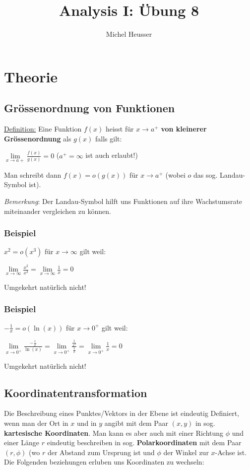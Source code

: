 \documentclass[11pt]{article} %
\title{Analysis I: Übung 8}
\author{Michel Heusser}
\begin{document}
\maketitle

\section{Theorie}

\subsection{Grössenordnung von Funktionen}
\underline{Definition:} Eine Funktion $f(x)$ heisst für $x \rightarrow a^+$ {\bf von kleinerer Grössenordnung} als $g(x)$ falls gilt:
\begin{center}
$\lim \limits_{x \rightarrow a+} \frac{f(x)}{g(x)} = 0$ ($a^+ = \infty$ ist auch erlaubt!)
\end{center}
Man schreibt dann $f(x) = o(g(x))$ für $x \rightarrow a^+$ (wobei $o$ das sog. Landau-Symbol ist). 

\emph{Bemerkung}: Der Landau-Symbol hilft uns Funktionen auf ihre Wachstumsrate miteinander vergleichen zu können. 

\subsubsection{Beispiel}

$x^2 = o(x^3)$ für $x \rightarrow \infty$ gilt weil:

$\lim \limits_{x \rightarrow \infty} \frac{x^2}{x^3} = \lim \limits_{x \rightarrow \infty} \frac{1}{x} =0$ 

Umgekehrt natürlich nicht!

\subsubsection{Beispiel}

$-\frac{1}{x} = o(\ln(x))$ für $x \rightarrow 0^+$ gilt weil: 

$\lim \limits_{x \rightarrow 0^+} \frac{-\frac{1}{x}}{\ln(x)} = \lim \limits_{x \rightarrow 0^+} \frac{\frac{1}{x^2}}{\frac{1}{x}} =\lim \limits_{x \rightarrow 0^+} \frac{1}{x} = 0$ 

Umgekehrt natürlich nicht!

\subsection{Koordinatentransformation}
Die Beschreibung eines Punktes/Vektors in der Ebene ist eindeutig Definiert, wenn man der Ort in $x$ und in $y$ angibt mit dem Paar $(x,y)$ in sog. {\bf kartesische Koordinaten}. Man kann es aber auch mit einer Richtung $\phi$ und einer Länge $r$ eindeutig beschreiben in sog. {\bf Polarkoordinaten} mit dem Paar $(r,\phi)$ (wo $r$ der Abstand zum Ursprung ist und $\phi$ der Winkel zur $x$-Achse ist. Die Folgenden beziehungen erluben uns Koordinaten zu wechseln:
\end{document}
